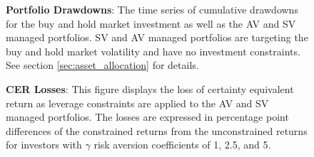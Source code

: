 \clearpage
%	
\clearpage
\begin{figure}[!htb]
	\caption{{\bf Portfolio Drawdowns}: The time series of cumulative drawdowns for the buy and hold market investment as well as the AV and SV managed portfolios. SV and AV managed portfolios are targeting the buy and hold market volatility and have no investment constraints. See section \ref{sec:asset_allocation} for details.} \label{fig:fig_drawdowns}
	\vspace{-4mm}
	\begin{adjustbox}{width=\textwidth}
	
	\end{adjustbox}
\end{figure}
\clearpage
\begin{figure}[!htb]
		\caption{{\bf CER Losses}: This figure displays the loss of certainty equivalent return as leverage constraints are applied to the AV and SV managed portfolios. The losses are expressed in percentage point differences of the constrained returns from the unconstrained returns for investors with $\gamma$ risk aversion coefficients of 1, 2.5, and 5.} \label{fig:cer_loss}
		\begin{adjustbox}{width=\textwidth}
			
		\end{adjustbox}
	\end{figure}
\clearpage
\begin{figure}[!htb]
		\caption{{\bf CER Gains}: Certainty Equivalent Return gains for mean variance investors with risk aversion coefficients ranging from 1 to 5 and subject to investment constraints ranging from 1 to 3. See section \ref{sec:asset_allocation} for details.} \label{fig:cer_gain}
%		
	\begin{subfigure}{\textwidth}
		
	\end{subfigure}
	\begin{subfigure}{\textwidth}
		
	\end{subfigure}
\end{figure}
